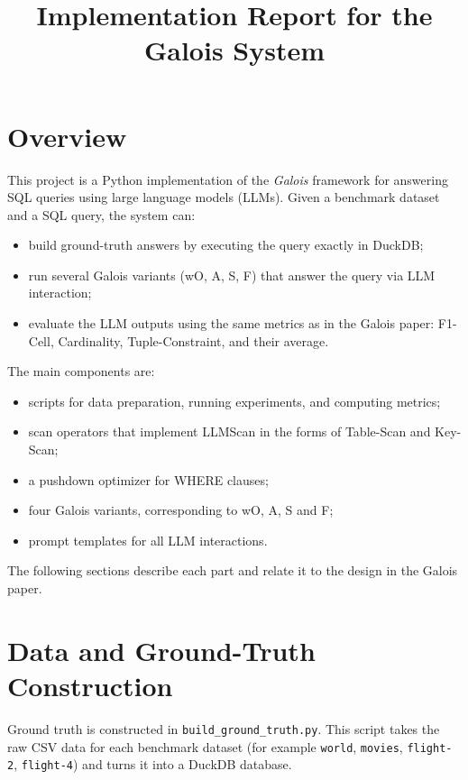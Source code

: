\documentclass[11pt]{article}
\title{Implementation Report for the Galois System}
\author{}
\date{}
\begin{document}
\maketitle

\section{Overview}

This project is a Python implementation of the \emph{Galois} framework for answering SQL queries using large language models (LLMs). Given a benchmark dataset and a SQL query, the system can:

\begin{itemize}
  \item build ground-truth answers by executing the query exactly in DuckDB;
  \item run several Galois variants (wO, A, S, F) that answer the query via LLM interaction;
  \item evaluate the LLM outputs using the same metrics as in the Galois paper: F1-Cell, Cardinality, Tuple-Constraint, and their average.
\end{itemize}

The main components are:

\begin{itemize}
  \item scripts for data preparation, running experiments, and computing metrics;
  \item scan operators that implement LLMScan in the forms of Table-Scan and Key-Scan;
  \item a pushdown optimizer for WHERE clauses;
  \item four Galois variants, corresponding to wO, A, S and F;
  \item prompt templates for all LLM interactions.
\end{itemize}

The following sections describe each part and relate it to the design in the Galois paper.

\section{Data and Ground-Truth Construction}

Ground truth is constructed in \texttt{build\_ground\_truth.py}. This script takes the raw CSV data for each benchmark dataset (for example \texttt{world}, \texttt{movies}, \texttt{flight-2}, \texttt{flight-4}) and turns it into a DuckDB database.
\end{document}

